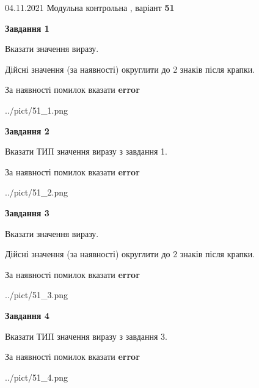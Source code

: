 \documentclass[11pt, ukrainian]{article}
\begin{document}
{04.11.2021 Модульна контрольна , варіант  \No \textbf { 51 }\par}
{
\begin {large}
{\begin {center}\textbf{Завдання 1}\end {center}}\par
Вказати значення виразу. \par
Дійсні значення (за наявності) округлити до 2 знаків після крапки. \par
За наявності помилок вказати \textbf{error}

\begin{center}
	{../pict/51_1.png}
\end{center}
\newpage

{\begin {center}\textbf{Завдання 2}\end {center}}\par
Вказати ТИП значення виразу з завдання 1. \par
За наявності помилок вказати \textbf{error}

\begin{center}
	{../pict/51_2.png}
\end{center}
\newpage

{\begin {center}\textbf{Завдання 3}\end {center}}\par
Вказати значення виразу. \par
Дійсні значення (за наявності) округлити до 2 знаків після крапки. \par
За наявності помилок вказати \textbf{error}

\begin{center}
	{../pict/51_3.png}
\end{center}
\newpage

{\begin {center}\textbf{Завдання 4}\end {center}}\par
Вказати ТИП значення виразу з завдання 3. \par
За наявності помилок вказати \textbf{error}

\begin{center}
	{../pict/51_4.png}
\end{center}
\newpage


\end{large}}
\end{document}
